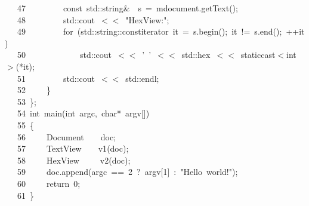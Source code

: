 \documentclass[9pt,onside,a4paper]{article}
\newcommand{\hlstd}[1]{\textcolor[rgb]{0.2,0,0.4}{#1}}
\newcommand{\hlnum}[1]{\textcolor[rgb]{0.2,0.73,0.02}{#1}}
\newcommand{\hlstr}[1]{\textcolor[rgb]{0.09,0.38,0.65}{#1}}
\newcommand{\hlopt}[1]{\textcolor[rgb]{0.33,0.33,0.33}{#1}}
\newcommand{\hllin}[1]{\textcolor[rgb]{0.6,0.6,0.6}{#1}}
\newcommand{\hlkwa}[1]{\textcolor[rgb]{1,0.19,0.19}{#1}}
\newcommand{\hlkwb}[1]{\textcolor[rgb]{0.96,0.55,0.14}{#1}}
\newcommand{\hlkwd}[1]{\textcolor[rgb]{0.82,0.11,0.93}{#1}}
\begin{document}
\hllin{\ \ \ 47\ }\hlstd{}\hlstd{\ \ \ \ \ \ \ \ }\hlstd{}\hlkwb{const\ }\hlstd{std}\hlopt{::}\hlstd{string}\hlopt{\&}\hlstd{\ \ }\hlopt{}\hlstd{s\ }\hlopt{=\ }\hlstd{m\textunderscore document}\hlopt{.}\hlstd{}\hlkwd{getText}\hlstd{}\hlopt{();}\\
\hllin{\ \ \ 48\ }\hlstd{}\hlstd{\ \ \ \ \ \ \ \ }\hlstd{std}\hlopt{::}\hlstd{cout\ }\hlopt{$<$$<$\ }\hlstd{}\hlstr{"HexView:"}\hlstd{}\hlopt{;}\\
\hllin{\ \ \ 49\ }\hlstd{}\hlstd{\ \ \ \ \ \ \ \ }\hlstd{}\hlkwa{for\ }\hlstd{}\hlopt{(}\hlstd{std}\hlopt{::}\hlstd{string}\hlopt{::}\hlstd{const\textunderscore iterator\ it\ }\hlopt{=\ }\hlstd{s}\hlopt{.}\hlstd{}\hlkwd{begin}\hlstd{}\hlopt{();\ }\hlstd{it\ }\hlopt{!=\ }\hlstd{s}\hlopt{.}\hlstd{}\hlkwd{end}\hlstd{}\hlopt{();\ ++}\hlstd{it}\hlopt{)}\\
\hllin{\ \ \ 50\ }\hlstd{}\hlstd{\ \ \ \ \ \ \ \ \ \ \ \ }\hlstd{std}\hlopt{::}\hlstd{cout\ }\hlopt{$<$$<$\ }\hlstd{}\hlstr{'\ '}\hlstd{\ }\hlopt{$<$$<$\ }\hlstd{std}\hlopt{::}\hlstd{hex\ }\hlopt{$<$$<$\ }\hlstd{}\hlkwa{static\textunderscore cast}\hlstd{}\hlopt{$<$}\hlstd{}\hlkwb{int}\hlstd{}\hlopt{$>$({*}}\hlstd{it}\hlopt{);}\\
\hllin{\ \ \ 51\ }\hlstd{}\hlstd{\ \ \ \ \ \ \ \ }\hlstd{std}\hlopt{::}\hlstd{cout\ }\hlopt{$<$$<$\ }\hlstd{std}\hlopt{::}\hlstd{endl}\hlopt{;}\\
\hllin{\ \ \ 52\ }\hlstd{}\hlstd{\ \ \ \ }\hlstd{}\hlopt{\}}\\
\hllin{\ \ \ 53\ }\hlstd{}\hlopt{\};}\\
\hllin{\ \ \ 54\ }\hlstd{}\hlkwb{int\ }\hlstd{}\hlkwd{main}\hlstd{}\hlopt{(}\hlstd{}\hlkwb{int\ }\hlstd{argc}\hlopt{,\ }\hlstd{}\hlkwb{char}\hlstd{}\hlopt{{*}\ }\hlstd{argv}\hlopt{{[}{]})}\\
\hllin{\ \ \ 55\ }\hlstd{}\hlopt{\{}\\
\hllin{\ \ \ 56\ }\hlstd{}\hlstd{\ \ \ \ }\hlstd{Document}\hlstd{\ \ \ \ }\hlstd{doc}\hlopt{;}\\
\hllin{\ \ \ 57\ }\hlstd{}\hlstd{\ \ \ \ }\hlstd{TextView}\hlstd{\ \ \ \ }\hlstd{}\hlkwd{v1}\hlstd{}\hlopt{(}\hlstd{doc}\hlopt{);}\\
\hllin{\ \ \ 58\ }\hlstd{}\hlstd{\ \ \ \ }\hlstd{HexView}\hlstd{\ \ \ \ \ }\hlstd{}\hlkwd{v2}\hlstd{}\hlopt{(}\hlstd{doc}\hlopt{);}\\
\hllin{\ \ \ 59\ }\hlstd{}\hlstd{\ \ \ \ }\hlstd{doc}\hlopt{.}\hlstd{}\hlkwd{append}\hlstd{}\hlopt{(}\hlstd{argc\ }\hlopt{==\ }\hlstd{}\hlnum{2\ }\hlstd{?\ argv}\hlopt{{[}}\hlstd{}\hlnum{1}\hlstd{}\hlopt{{]}\ :\ }\hlstd{}\hlstr{"Hello\ world!"}\hlstd{}\hlopt{);}\\
\hllin{\ \ \ 60\ }\hlstd{}\hlstd{\ \ \ \ }\hlstd{}\hlkwa{return\ }\hlstd{}\hlnum{0}\hlstd{}\hlopt{;}\\
\hllin{\ \ \ 61\ }\hlstd{}\hlopt{\}}\hlstd{}\\
\mbox{}
\normalfont
\normalsize
\end{document}
